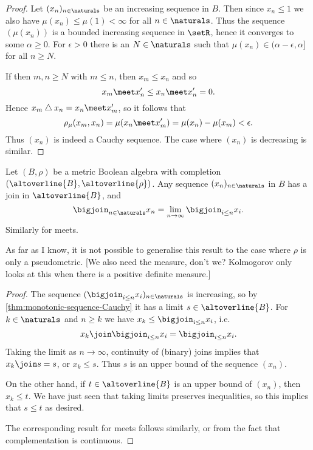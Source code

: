 \documentclass[article, a4paper, 11pt, oneside]{memoir}
\numberwithin{equation}{chapter}
\renewcommand{\symdiff}{\mathbin{\triangle}}
\begin{document}
\begin{proof}
    Let $(x_n)_{n\in\naturals}$ be an increasing sequence in $B$. Then since $x_n \leq 1$ we also have $\mu(x_n) \leq \mu(1) < \infty$ for all $n \in \naturals$. Thus the sequence $(\mu(x_n))$ is a bounded increasing sequence in $\setR$, hence it converges to some $\alpha \geq 0$. For $\epsilon > 0$ there is an $N \in \naturals$ such that $\mu(x_n) \in (\alpha - \epsilon, \alpha]$ for all $n \geq N$.
    
    If then $m,n \geq N$ with $m \leq n$, then $x_m \leq x_n$ and so
    \begin{equation*}
        x_m \meet x_n'
            \leq x_n \meet x_n'
            = 0.
    \end{equation*}
    Hence $x_m \symdiff x_n = x_n \meet x_m'$, so it follows that
    \begin{equation*}
        \rho_\mu(x_m,x_n)
            = \mu(x_n \meet x_m')
            = \mu(x_n) - \mu(x_m)
            < \epsilon.
    \end{equation*}
    Thus $(x_n)$ is indeed a Cauchy sequence. The case where $(x_n)$ is decreasing is similar.
\end{proof}


\begin{proposition}
    Let $(B,\rho)$ be a metric Boolean algebra with completion $(\altoverline{B}, \altoverline{\rho})$. Any sequence $(x_n)_{n\in\naturals}$ in $B$ has a join in $\altoverline{B}$, and
    \begin{equation*}
        \bigjoin_{n\in\naturals} x_n
            = \lim_{n\to\infty} \bigjoin_{i \leq n} x_i.
    \end{equation*}
    Similarly for meets.
\end{proposition}
%
As far as I know, it is not possible to generalise this result to the case where $\rho$ is only a pseudometric. [We also need the measure, don't we? Kolmogorov only looks at this when there is a positive definite measure.]

\begin{proof}
    The sequence $( \bigjoin_{i \leq n} x_i )_{n\in\naturals}$ is increasing, so by \cref{thm:monotonic-sequence-Cauchy} it has a limit $s \in \altoverline{B}$. For $k \in \naturals$ and $n \geq k$ we have $x_k \leq \bigjoin_{i \leq n} x_i$, i.e.
    \begin{equation*}
        x_k \join \bigjoin_{i \leq n} x_i
            = \bigjoin_{i \leq n} x_i.
    \end{equation*}
    Taking the limit as $n \to \infty$, continuity of (binary) joins implies that $x_k \join s = s$, or $x_k \leq s$. Thus $s$ is an upper bound of the sequence $(x_n)$.

    On the other hand, if $t \in \altoverline{B}$ is an upper bound of $(x_n)$, then $x_k \leq t$. We have just seen that taking limits preserves inequalities, so this implies that $s \leq t$ as desired.

    The corresponding result for meets follows similarly, or from the fact that complementation is continuous.
\end{proof}
\end{document}
